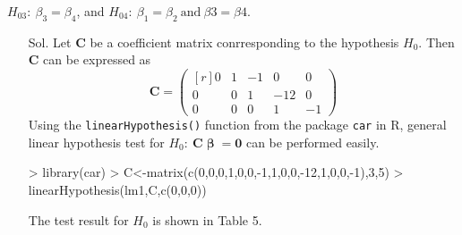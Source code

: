 \documentclass[12pt]{article} %
\begin{document}
\begin{enumerate}
\begin{itemize}
		 $H_{03}:~\beta_{3}=\beta_{4}$, and $H_{04}:~\beta_{1}=\beta_{2}~\mathrm{and}~\beta{3}=\beta{4}$.
		  \begin{itemize}
		   \item[Sol.] Let $\mathbf{C}$ be a coefficient matrix conrresponding to the hypothesis $H_0$. 
		   Then $\mathbf{C}$ can be expressed as
		   \begin{equation*}
		   \mathbf{C}=
		   \begin{pmatrix}[r]
		   0 & 1 & -1 &  0 & 0 \\ 
		   0 & 0 &  1 &-12 & 0 \\
		   0 & 0 &  0 &  1 &-1
		   \end{pmatrix}
		   \end{equation*}
		   Using the \verb|linearHypothesis()| function from the package \verb|car| in R, general linear
		   hypothesis test for $H_{0}:~\mathbf{C}\pmb{\upbeta}=\mathbf{0}$ can be performed easily.
\begin{Schunk}
\begin{Sinput}
> library(car)
> C<-matrix(c(0,0,0,1,0,0,-1,1,0,0,-12,1,0,0,-1),3,5)
> linearHypothesis(lm1,C,c(0,0,0))
\end{Sinput}
\end{Schunk}
		  The test result for $H_{0}$ is shown in Table 5.


\end{itemize}
\end{itemize}
\end{enumerate}
\end{document}
